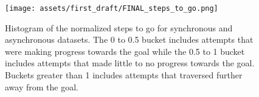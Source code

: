 \begin{figure}[t!]
    \centering
    \texttt{[image: assets/first\_draft/FINAL\_steps\_to\_go.png]}
    \caption{Histogram of the normalized steps to go for synchronous and asynchronous datasets. The 0 to 0.5 bucket includes attempts that were making progress towards the goal while the 0.5 to 1 bucket includes attempts that made little to no progress towards the goal. Buckets greater than 1 includes attempts that traversed further away from the goal.
    }
    \label{fig:histogram_steps_to_go}
\end{figure}